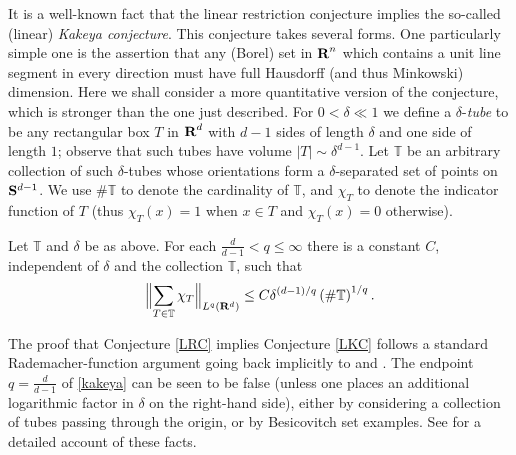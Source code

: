 It is a well-known fact that the linear
restriction conjecture implies the so-called (linear)
\emph{Kakeya conjecture}.  This conjecture takes several forms.
One particularly simple one is the assertion that any (Borel) set in ${\hbox{\bf R}}^n$
which contains a unit line segment in every direction must have full Hausdorff (and
thus Minkowski) dimension.  Here we shall consider a more quantitative version
of the conjecture, which is stronger than the one just described.
For $0<\delta\ll 1$ we define a
$\delta$-\textit{tube} to be any rectangular box $T$ in ${\hbox{\bf R}}^{d}$ with $d-1$
sides of length $\delta$ and one side of length $1$; observe that such tubes have
volume $|T| \sim \delta^{d-1}$. Let
$\mathbb{T}$ be an arbitrary collection of such $\delta$-tubes
whose orientations form a $\delta$-separated set of points on
${\bf S}^{d-1}$.
We use $\# \mathbb{T}$ to denote the cardinality of $\mathbb{T}$, and $\chi_T$ to denote the indicator
function of $T$ (thus $\chi_T(x) = 1$ when $x \in T$ and $\chi_T(x)=0$ otherwise).

\begin{conjecture}\label{LKC}  Let $\mathbb{T}$ and $\delta$ be as above.
For each $\tfrac{d}{d-1}<q\leq\infty$ there is a constant $C$,
independent of $\delta$ and the collection $\mathbb{T}$, such that
\begin{equation}\label{kakeya}
\Bigl\|\sum_{T\in\mathbb{T}}\chi_{T}\Bigr\|_{L^{q}({\bf
R}^{d})} \leq C\delta^{(d-1)/q}\left(
\# \mathbb{T}\right)^{1/q}.
\end{equation}
\end{conjecture}
The proof that Conjecture \ref{LRC} implies Conjecture \ref{LKC}
follows a standard
Rademacher-function argument going back implicitly to \cite{Feff}
and \cite{BCSS}.
The endpoint $q=\tfrac{d}{d-1}$ of \eqref{kakeya} can be seen to be
false (unless one places an additional
logarithmic factor in $\delta$ on the right-hand side), either
by considering a collection of tubes passing through
the origin, or by Besicovitch set examples.
See \cite{Wolffbook} for a detailed account of these facts.

